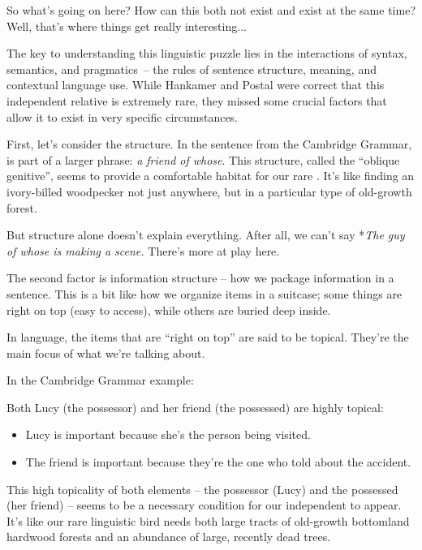 \bigskip

So what's going on here? How can this  both not exist and exist at the same time? Well, that's where things get really interesting...

The key to understanding this linguistic puzzle lies in the interactions of syntax, semantics, and pragmatics~-- the rules of sentence structure, meaning, and contextual language use. While Hankamer and Postal were correct that this independent relative  is extremely rare, they missed some crucial factors that allow it to exist in very specific circumstances.

First, let's consider the structure. In the sentence from the Cambridge Grammar,  is part of a larger phrase: \textit{a friend of whose}. This structure, called the \enquote{oblique genitive}, seems to provide a comfortable habitat for our rare . It's like finding an ivory-billed woodpecker not just anywhere, but in a particular type of old-growth forest.

But structure alone doesn't explain everything. After all, we can't say *\textit{The guy of whose is making a scene.} There's more at play here.

The second factor is information structure -- how we package information in a sentence. This is a bit like how we organize items in a suitcase; some things are right on top (easy to access), while others are buried deep inside.

In language, the items that are \enquote{right on top} are said to be topical. They're the main focus of what we're talking about.

In the Cambridge Grammar example:

\z

Both Lucy (the possessor) and her friend (the possessed) are highly topical:

\begin{itemize}
    \item Lucy is important because she's the person being visited.
    \item The friend is important because they're the one who told about the accident.
\end{itemize}

This high topicality of both elements -- the possessor (Lucy) and the possessed (her friend) -- seems to be a necessary condition for our independent  to appear. It's like our rare linguistic bird needs both large tracts of old-growth bottomland hardwood forests and an abundance of large, recently dead trees.

